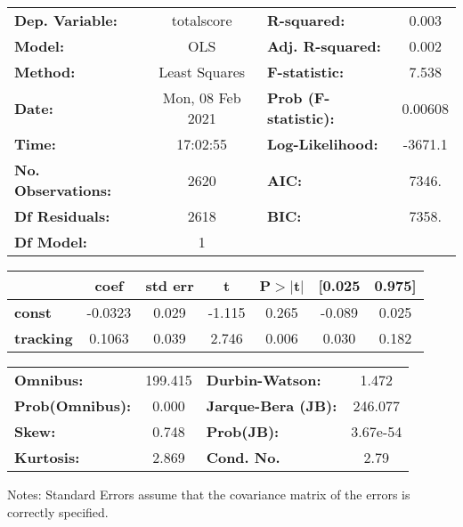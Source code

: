 \begin{center}
\begin{tabular}{lclc}
\toprule
\textbf{Dep. Variable:}    &    totalscore    & \textbf{  R-squared:         } &     0.003   \\
\textbf{Model:}            &       OLS        & \textbf{  Adj. R-squared:    } &     0.002   \\
\textbf{Method:}           &  Least Squares   & \textbf{  F-statistic:       } &     7.538   \\
\textbf{Date:}             & Mon, 08 Feb 2021 & \textbf{  Prob (F-statistic):} &  0.00608    \\
\textbf{Time:}             &     17:02:55     & \textbf{  Log-Likelihood:    } &   -3671.1   \\
\textbf{No. Observations:} &        2620      & \textbf{  AIC:               } &     7346.   \\
\textbf{Df Residuals:}     &        2618      & \textbf{  BIC:               } &     7358.   \\
\textbf{Df Model:}         &           1      & \textbf{                     } &             \\
\bottomrule
\end{tabular}
\begin{tabular}{lcccccc}
                  & \textbf{coef} & \textbf{std err} & \textbf{t} & \textbf{P$> |$t$|$} & \textbf{[0.025} & \textbf{0.975]}  \\
\midrule
\textbf{const}    &      -0.0323  &        0.029     &    -1.115  &         0.265        &       -0.089    &        0.025     \\
\textbf{tracking} &       0.1063  &        0.039     &     2.746  &         0.006        &        0.030    &        0.182     \\
\bottomrule
\end{tabular}
\begin{tabular}{lclc}
\textbf{Omnibus:}       & 199.415 & \textbf{  Durbin-Watson:     } &    1.472  \\
\textbf{Prob(Omnibus):} &   0.000 & \textbf{  Jarque-Bera (JB):  } &  246.077  \\
\textbf{Skew:}          &   0.748 & \textbf{  Prob(JB):          } & 3.67e-54  \\
\textbf{Kurtosis:}      &   2.869 & \textbf{  Cond. No.          } &     2.79  \\
\bottomrule
\end{tabular}
\end{center}

Notes: \newline
 [1] Standard Errors assume that the covariance matrix of the errors is correctly specified.

